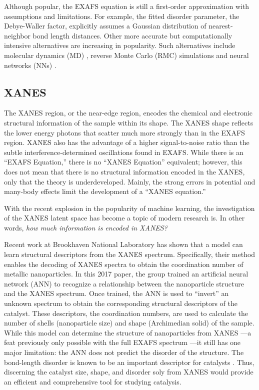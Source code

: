 Although popular, the EXAFS equation is still a first-order approximation with assumptions and limitations. For example, the fitted disorder parameter, the Debye-Waller factor, explicitly assumes a Gaussian distribution of nearest-neighbor bond length distances. Other more accurate but computationally intensive alternatives are increasing in popularity. Such alternatives include molecular dynamics (MD) \cite{mol-dyn-xanes}, reverse Monte Carlo (RMC) simulations  \cite{RMC-xanes} and neural networks (NNs) \cite{lin2020machine} \cite{timoshenko2018neural}.

\subsection{XANES}
The XANES region, or the near-edge region, encodes the chemical and electronic structural information of the sample within its shape. The XANES shape reflects the lower energy photons that scatter much more strongly than in the EXAFS region. XANES also has the advantage of a higher signal-to-noise ratio than the subtle interference-determined oscillations found in EXAFS. While there is an ``EXAFS Equation,'' there is no ``XANES Equation'' equivalent; however, this does not mean that there is no structural information encoded in the XANES, only that the theory is underdeveloped. Mainly, the strong errors in potential and many-body effects limit the development of a ``XANES equation.'' 

With the recent explosion in the popularity of machine learning, the investigation of the XANES latent space has become a topic of modern research is. In other words, \textit{how much information is encoded in XANES?}

Recent work at Brookhaven National Laboratory \cite{Timoshenko2017} has shown that a model can learn structural descriptors from the XANES spectrum. Specifically, their method enables the decoding of XANES spectra to obtain the coordination number of metallic nanoparticles. In this 2017 paper, the group trained an artificial neural network (ANN) to recognize a relationship between the nanoparticle structure and the XANES spectrum. Once trained, the ANN is used to ``invert'' an unknown spectrum to obtain the corresponding structural descriptors of the catalyst. These descriptors, the coordination numbers, are used to calculate the number of shells (nanoparticle size) and shape (Archimedian solid) of the sample. While this model can determine the structure of nanoparticles from XANES ---a feat previously only possible with the full EXAFS spectrum ---it still has one major limitation: the ANN does not predict the disorder of the structure. The bond-length disorder is known to be an important descriptor for catalysts \cite{catalyst-strain-dependence} \cite{co-strain-effects}. Thus, discerning the catalyst size, shape, and disorder soly from XANES would provide an efficient and comprehensive tool for studying catalysis.

